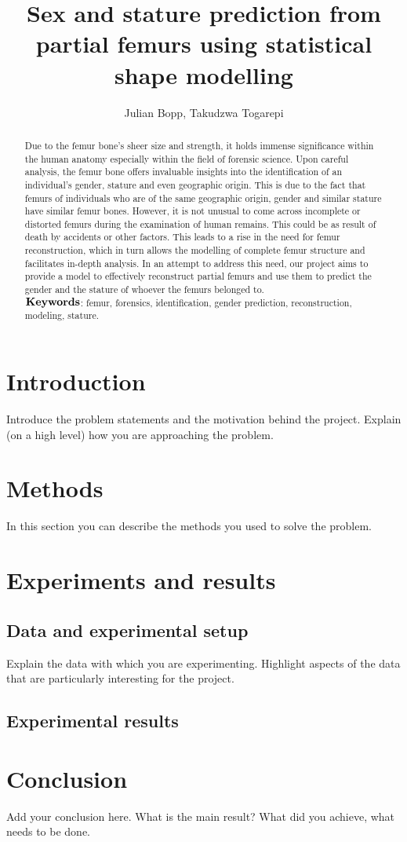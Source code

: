 \documentclass[10pt]{article}
\author{Julian Bopp, Takudzwa Togarepi}
\title{Sex and stature prediction from partial femurs using statistical shape modelling}
\theoremstyle{definition}
\begin{document}
\maketitle

\begin{abstract}
\noindent
Due to the femur bone's sheer size and strength, it holds immense significance within the human anatomy especially within the field of forensic science. Upon careful analysis, the femur bone offers invaluable insights into the identification of an individual's gender, stature and even geographic origin. This is due to the fact that femurs of individuals who are of the same geographic origin, gender and similar stature have similar femur bones. However, it is not unusual to come across incomplete or distorted femurs during the examination of human remains. This could be as result of death by accidents or other factors. This leads to a rise in the need for femur reconstruction, which in turn allows the modelling of complete femur structure and facilitates in-depth analysis. In an attempt to address this need, our project aims to  provide a model to effectively reconstruct partial femurs and use them to predict the gender and the stature of whoever the femurs belonged to.\\

\noindent
$\bold{Keywords}$: femur, forensics, identification, gender prediction, reconstruction, modeling, stature.\\

\end{abstract}
\section{Introduction}

Introduce the problem statements and the motivation behind the project.
Explain (on a high level) how you are approaching the problem. 

\section{Methods}

In this section you can describe the methods you used to solve the problem.


\section{Experiments and results}

\subsection{Data and experimental setup}

Explain the data with which you are experimenting.
Highlight aspects of the data that are particularly interesting 
for the project. 

\subsection{Experimental results}


\section{Conclusion}

Add your conclusion here. What is the main result? What did you achieve, what 
needs to be done. 
\end{document}

